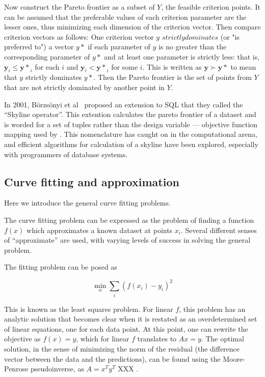   Now construct the Pareto frontier as a subset of $Y$, the feasible criterion points.
  It can be assumed that the preferable values of each criterion parameter are the lesser ones, thus minimizing each dimension of the criterion vector. Then compare criterion vectors as follows:
  One criterion vector $y$ $strictly dominates$ (or "is preferred to") a vector $y*$ if each parameter of $y$ is no greater than the corresponding parameter of $y*$ and at least one parameter is strictly less: that is, $\mathbf{y}_i \le \mathbf{y*}_i$ for each $i$ and $\mathbf{y}_i < \mathbf{y*}_i$ for some $i$.
This is written as $\mathbf{y} \succ \mathbf{y*}$ to mean that $y$ strictly dominates $y*$.
Then the Pareto frontier is the set of points from $Y$ that are not strictly dominated by another point in $Y$.

In 2001, B\"orzs\"onyi et al \citehere\ proposed an extension to SQL that they called the ``Skyline operator''.
This extention calculates the pareto frontier of a dataset and is worded for a set of tuples rather than the design variable --- objective function mapping used by \citet{deb.kalyanmoy2001multi-objective}.
This nomenclature has caught on in the computational arena, and efficient algorithms for calculation of a skyline have been explored, especially with
programmers of database systems.

\subsection{Curve fitting and approximation}
Here we introduce the general curve fitting problems.

The curve fitting problem can be expressed as the problem of finding a function $f(x)$ which approximates a known dataset at points $x_i$.
Several different senses of ``approximate'' are used, with varying levels of success in solving the general problem.

The fitting problem can be posed as

\begin{equation}
  \label{eq:1}
  \min_{\alpha} \sum_i (f(x_i) - y_i)^2
\end{equation}

This is known as the least squares problem. For linear $f$, this problem has an analytic solution that becomes clear when it is restated as an overdetermined set of linear equations, one for each data point.
At this point, one can rewrite the objective as $f(x) = y$, which for linear $f$ translates to $Ax=y$.
The optimal solution, in the sense of minimizing the norm of the residual (the difference vector between the data and the predictions), can be found using the Moore-Penrose pseudoinverse, as $A = x^Ty^T$ XXX .

